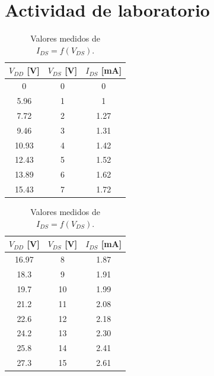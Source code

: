 \documentclass[chaptersright]{informeutn}
\begin{document}
\section{Actividad de laboratorio}
\begin{table}[h!]
    \centering
    \begin{minipage}{0.45\textwidth}
        \centering
        \begin{tabular}{c c c}
            \toprule
            $V_{DD}$ [V] & $V_{DS}$ [V] & $I_{DS}$ [mA] \\
            \midrule
            0     & 0  & 0    \\
            5.96  & 1  & 1    \\
            7.72  & 2  & 1.27 \\
            9.46  & 3  & 1.31 \\
            10.93 & 4  & 1.42 \\
            12.43 & 5  & 1.52 \\
            13.89 & 6  & 1.62 \\
            15.43 & 7  & 1.72 \\
            \bottomrule
        \end{tabular}
    \end{minipage}%
    \hfill
    \begin{minipage}{0.45\textwidth}
        \centering
        \begin{tabular}{c c c}
            \toprule
            $V_{DD}$ [V] & $V_{DS}$ [V] & $I_{DS}$ [mA] \\
            \midrule
            16.97 & 8  & 1.87 \\
            18.3  & 9  & 1.91 \\
            19.7  & 10 & 1.99 \\
            21.2  & 11 & 2.08 \\
            22.6  & 12 & 2.18 \\
            24.2  & 13 & 2.30 \\
            25.8  & 14 & 2.41 \\
            27.3  & 15 & 2.61 \\
            \bottomrule
        \end{tabular}
    \end{minipage}
    \caption{Valores medidos de $I_{DS} = f(V_{DS})$.}
\end{table}
\end{document}
